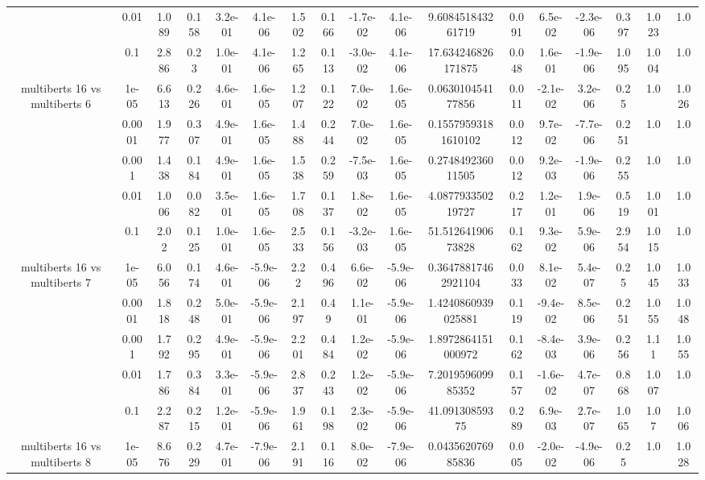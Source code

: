\begin{tabular}{|c|c|c|c|c|c|c|c|c|c|c|c|c|c|c|c|c|}
 & 0.01 & 1.089 & 0.158 & 3.2e-01 & 4.1e-06 & 1.502 & 0.166 & -1.7e-02 & 4.1e-06 & 9.608451843261719 & 0.091 & 6.5e-02 & -2.3e-06 & 0.397 & 1.023 & 1.0 \\
 & 0.1 & 2.886 & 0.23 & 1.0e-01 & 4.1e-06 & 1.265 & 0.113 & -3.0e-02 & 4.1e-06 & 17.634246826171875 & 0.048 & 1.6e-01 & -1.9e-06 & 1.095 & 1.004 & 1.0 \\
\hline
\multirow{5}{*}{multiberts 16 vs multiberts 6} & 1e-05 & 6.613 & 0.226 & 4.6e-01 & 1.6e-05 & 1.207 & 0.122 & 7.0e-02 & 1.6e-05 & 0.063010454177856 & 0.011 & -2.1e-02 & 3.2e-06 & 0.25 & 1.0 & 1.026 \\
 & 0.0001 & 1.977 & 0.307 & 4.9e-01 & 1.6e-05 & 1.488 & 0.244 & 7.0e-02 & 1.6e-05 & 0.15579593181610102 & 0.012 & 9.7e-02 & -7.7e-06 & 0.251 & 1.0 & 1.0 \\
 & 0.001 & 1.438 & 0.184 & 4.9e-01 & 1.6e-05 & 1.538 & 0.259 & -7.5e-03 & 1.6e-05 & 0.274849236011505 & 0.012 & 9.2e-03 & -1.9e-06 & 0.255 & 1.0 & 1.0 \\
 & 0.01 & 1.006 & 0.082 & 3.5e-01 & 1.6e-05 & 1.708 & 0.137 & 1.8e-02 & 1.6e-05 & 4.087793350219727 & 0.217 & 1.2e-01 & 1.9e-06 & 0.519 & 1.001 & 1.0 \\
 & 0.1 & 2.02 & 0.125 & 1.0e-01 & 1.6e-05 & 2.533 & 0.156 & -3.2e-03 & 1.6e-05 & 51.51264190673828 & 0.162 & 9.3e-02 & 5.9e-06 & 2.954 & 1.015 & 1.0 \\
\hline
\multirow{5}{*}{multiberts 16 vs multiberts 7} & 1e-05 & 6.056 & 0.174 & 4.6e-01 & -5.9e-06 & 2.22 & 0.496 & 6.6e-02 & -5.9e-06 & 0.36478817462921104 & 0.033 & 8.1e-02 & 5.4e-07 & 0.25 & 1.045 & 1.033 \\
 & 0.0001 & 1.818 & 0.248 & 5.0e-01 & -5.9e-06 & 2.197 & 0.49 & 1.1e-01 & -5.9e-06 & 1.4240860939025881 & 0.119 & -9.4e-02 & 8.5e-06 & 0.251 & 1.055 & 1.048 \\
 & 0.001 & 1.792 & 0.295 & 4.9e-01 & -5.9e-06 & 2.201 & 0.484 & 1.2e-02 & -5.9e-06 & 1.8972864151000972 & 0.162 & -8.4e-03 & 3.9e-06 & 0.256 & 1.11 & 1.055 \\
 & 0.01 & 1.786 & 0.384 & 3.3e-01 & -5.9e-06 & 2.837 & 0.243 & 1.2e-02 & -5.9e-06 & 7.201959609985352 & 0.157 & -1.6e-02 & 4.7e-07 & 0.868 & 1.007 & 1.0 \\
 & 0.1 & 2.287 & 0.215 & 1.2e-01 & -5.9e-06 & 1.961 & 0.198 & 2.3e-02 & -5.9e-06 & 41.09130859375 & 0.289 & 6.9e-03 & 2.7e-07 & 1.065 & 1.07 & 1.006 \\
\hline
\multirow{5}{*}{multiberts 16 vs multiberts 8} & 1e-05 & 8.676 & 0.229 & 4.7e-01 & -7.9e-06 & 2.191 & 0.116 & 8.0e-02 & -7.9e-06 & 0.043562076985836 & 0.005 & -2.0e-02 & -4.9e-06 & 0.25 & 1.0 & 1.028 \\

\end{tabular}
